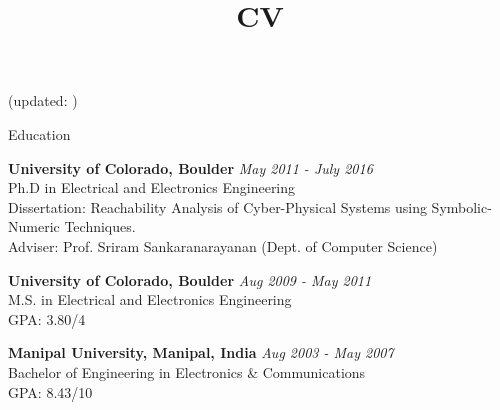 \fontsize{10}{12}
\title{CV}
\renewcommand*{\thefilemoddate}[3]{\formatdate{#3}{#2}{#1}}

\renewcommand{\headrulewidth}{0pt}
\pagestyle{fancy}


\address{(678)~$\cdot$~429~$\cdot$~5502 \\ aditya.zutshi@colorado.edu} %
\address{\url{http://eces.colorado.edu/~zutshi/}}
\address{Boulder, Colorado} %

%
\begin{center}
\vspace{-.2cm}
\scriptsize{({updated: \filemodprintdate{\jobname}})}
\vspace{.5cm}
\end{center}



\begin{rSection}{Education}

{\bf University of Colorado, Boulder} \hfill {\em May 2011 - July 2016} \\ 
Ph.D in Electrical and Electronics Engineering\\
Dissertation: Reachability Analysis of Cyber-Physical Systems using Symbolic-Numeric Techniques.\\
Adviser: Prof. Sriram Sankaranarayanan (Dept. of Computer Science)

{\bf University of Colorado, Boulder} \hfill {\em Aug 2009 - May 2011} \\ 
M.S. in Electrical and Electronics Engineering \\
GPA: 3.80/4

{\bf Manipal University, Manipal, India} \hfill {\em Aug 2003 - May 2007} \\ 
Bachelor of Engineering in Electronics \& Communications \\
GPA: 8.43/10

\end{rSection}

